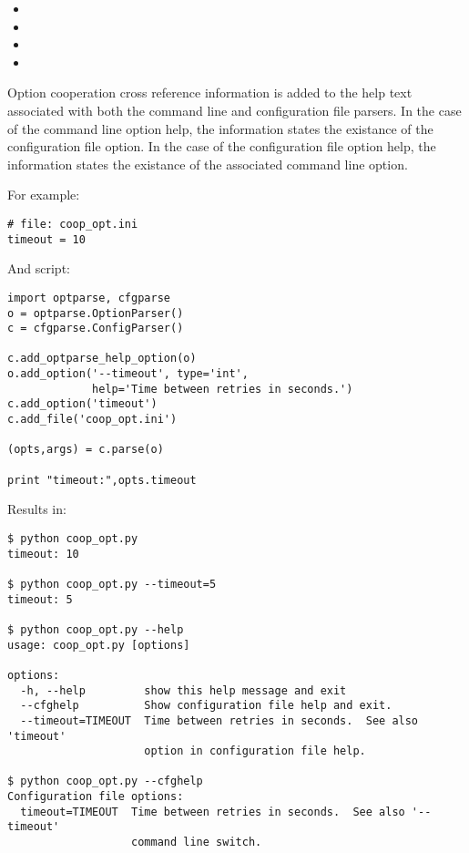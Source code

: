 \documentclass{howto}
\begin{document}
\begin{itemize}
\item {}
\item {}
\item {}
\item {}
\end{itemize}

Option cooperation cross reference information is added to the help text 
associated with both the command line and configuration file parsers.  In the 
case of the command line option help, the information states the existance
of the configuration file option.  In the case of the configuration file option 
help, the information states the existance of the associated command line 
option.

For example:

\begin{verbatim}
# file: coop_opt.ini
timeout = 10
\end{verbatim}

And script:

\begin{verbatim}
import optparse, cfgparse
o = optparse.OptionParser()
c = cfgparse.ConfigParser()

c.add_optparse_help_option(o)
o.add_option('--timeout', type='int', 
             help='Time between retries in seconds.')
c.add_option('timeout')
c.add_file('coop_opt.ini')

(opts,args) = c.parse(o)

print "timeout:",opts.timeout
\end{verbatim}

Results in:
\begin{verbatim}
$ python coop_opt.py
timeout: 10

$ python coop_opt.py --timeout=5
timeout: 5

$ python coop_opt.py --help
usage: coop_opt.py [options]

options:
  -h, --help         show this help message and exit
  --cfghelp          Show configuration file help and exit.
  --timeout=TIMEOUT  Time between retries in seconds.  See also 'timeout'
                     option in configuration file help.

$ python coop_opt.py --cfghelp
Configuration file options:
  timeout=TIMEOUT  Time between retries in seconds.  See also '--timeout'
                   command line switch.
\end{verbatim}
\end{document}
